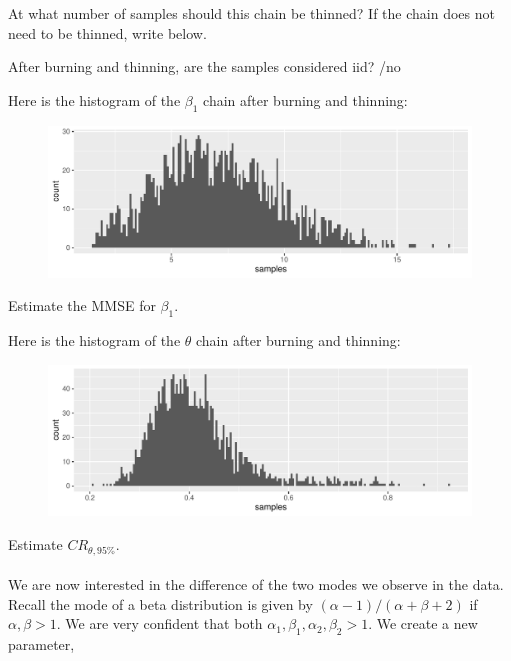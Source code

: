 \documentclass[12pt]{article}
\begin{document}
\begin{enumerate}
 At what number of samples should this chain be thinned? If the chain does not need to be thinned, write  below.\\


 After burning and thinning, are the samples considered iid? /no 

Here is the histogram of the $\beta_1$ chain after burning and thinning:

\begin{figure}[htp]
\centering
\includegraphics[width=6in]{beta_1_posterior}
\end{figure}

 Estimate the MMSE for $\beta_1$.\\

\pagebreak

Here is the histogram of the $\theta$ chain after burning and thinning:

\begin{figure}[htp]
\centering
\includegraphics[width=5.5in]{theta_posterior}
\end{figure}


 Estimate $CR_{\theta, 95\%}$.\\

\\

We are now interested in the difference of the two modes we observe in the data. Recall the mode of a beta distribution is given by $(\alpha-1)/(\alpha+\beta+2)$ if $\alpha, \beta >1$. We are very confident that both $\alpha_1, \beta_1, \alpha_2, \beta_2 >1$. We create a new parameter,


\end{enumerate}
\end{document}
